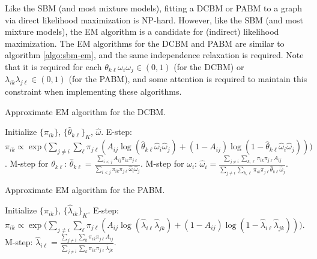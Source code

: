 \documentclass[
  12pt,
]{article}
\theoremstyle{definition}
\theoremstyle{definition}
\theoremstyle{definition}
\theoremstyle{definition}
\theoremstyle{remark}
\begin{document}
Like the SBM (and most mixture models), fitting a DCBM or PABM to a graph via direct likelihood maximization is NP-hard.
However, like the SBM (and most mixture models), the EM algorithm is a candidate for (indirect) likelihood maximization.
The EM algorithms for the DCBM and PABM are similar to algorithm \ref{algo:sbm-em}, and the same independence relaxation is required.
Note that it is required for each \(\theta_{k \ell} \omega_i \omega_j \in (0, 1)\) (for the DCBM) or \(\lambda_{ik} \lambda_{j \ell} \in (0, 1)\) (for the PABM), and some attention is required to maintain this constraint when implementing these algorithms.

\begin{algorithm}
  \label{algo:dcbm-em}
  \DontPrintSemicolon
  \SetAlgoLined
  \caption{Approximate EM algorithm for the DCBM.}
  Initialize $\{\pi_{ik}\}$, $\{\hat{\theta}_{k \ell}\}_K$, $\hat{\omega}$.\;
  \While{$\|\nabla \ell\| > \epsilon$} {
     {
       {
      E-step: $\pi_{ik} \propto \exp \bigg( \sum_{j \neq i} \sum_{\ell} \pi_{j \ell} (A_{ij} \log (\hat{\theta}_{k \ell} \hat{\omega}_i \hat{\omega}_j) + (1 - A_{ij}) \log (1 - \hat{\theta}_{k \ell} \hat{\omega}_i \hat{\omega}_j)) \bigg)$.\;
      }
    }
     {
       {
        M-step for $\theta_{k \ell}$: $\hat{\theta}_{k \ell} = \frac{\sum_{i < j} A_{ij} \pi_{ik} \pi_{j \ell}}{\sum_{i < j} \pi_{ik} \pi_{j \ell} \hat{\omega}_i \hat{\omega}_j}$.\;
      }
    }
     {
      M-step for $\omega_i$: $\hat{\omega}_i = \frac{\sum_{j \neq i} \sum_{k, \ell} \pi_{ik} \pi_{j \ell} A_{ij}}{\sum_{j \neq i} \sum_{k, \ell} \pi_{ik} \pi_{j \ell} \hat{\theta}_{k \ell} \hat{\omega}_j}$.\;
    }
  }
\end{algorithm}

\begin{algorithm}
  \label{algo:pabm-em}
  \DontPrintSemicolon
  \SetAlgoLined
  \caption{Approximate EM algorithm for the PABM.}
  Initialize $\{\pi_{ik}\}$, $\{\hat{\lambda}_{ik}\}_K$.\;
  \While{$\|\nabla \ell\| > \epsilon$} {
     {
       {
        E-step: $\pi_{ik} \propto \exp \bigg( \sum_{j \neq i} \sum_{\ell} \pi_{j \ell} (A_{ij} \log (\hat{\lambda}_{i \ell} \hat{\lambda}_{j k}) + (1 - A_{ij}) \log (1 - \hat{\lambda}_{i \ell} \hat{\lambda}_{j k})) \bigg)$.\;
      }
    }
     {
       {
        M-step: $\hat{\lambda}_{i \ell} = \frac{\sum_{j \neq i} \sum_k \pi_{ik} \pi_{j \ell} A_{ij}}{\sum_{j \neq i} \sum_k \pi_{ik} \pi_{j \ell} \hat{\lambda}_{j k}}$.\;
      }
    }
  }
\end{algorithm}
\end{document}
